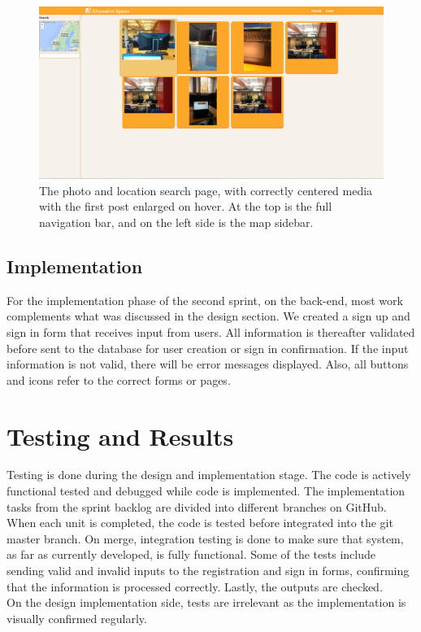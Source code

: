 \begin{figure}[ht!]
\centering
\includegraphics[width={\linewidth}]{Sprint2/img/Sprint2-PhotoPage.png}
\caption{The photo and location search page, with correctly centered media with the first post enlarged on hover. At the top is the full navigation bar, and on the left side is the map sidebar. \label{overflow}}
\end{figure}


\subsection{Implementation}
\label{subsec:S2DesignImplImpl}
For the implementation phase of the second sprint, on the back-end, most work complements what was discussed in the design section. We created a sign up and sign in form that receives input from users. All information is thereafter validated before sent to the database for user creation or sign in confirmation. If the input information is not valid, there will be error messages displayed. Also, all buttons and icons refer to the correct forms or pages.

\section{Testing and Results}
\label{sec:S2Testing}
Testing is done during the design and implementation stage. The code is actively functional tested and debugged while code is implemented. The implementation tasks from the sprint backlog are divided into different branches on GitHub. When each unit is completed, the code is tested before integrated into the git master branch. On merge, integration testing is done to make sure that system, as far as currently developed, is fully functional. Some of the tests include sending valid and invalid inputs to the registration and sign in forms, confirming that the information is processed correctly. Lastly, the outputs are checked. \\
On the design implementation side, tests are irrelevant as the implementation is visually confirmed regularly. 


